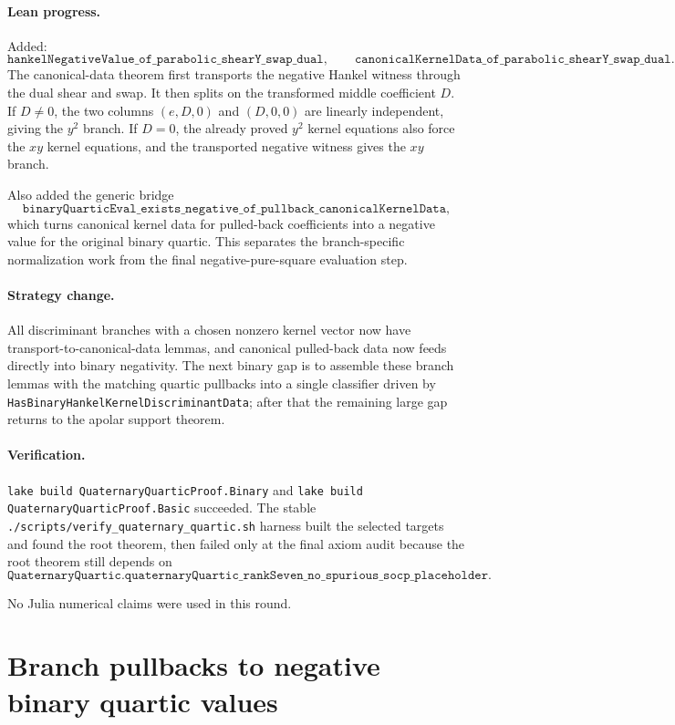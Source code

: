 \documentclass[11pt]{article}
\begin{document}
\paragraph{Lean progress.}
Added:
\[
\texttt{hankelNegativeValue\_of\_parabolic\_shearY\_swap\_dual},
\qquad
\texttt{canonicalKernelData\_of\_parabolic\_shearY\_swap\_dual}.
\]
The canonical-data theorem first transports the negative Hankel witness through
the dual shear and swap.  It then splits on the transformed middle coefficient
\(D\).  If \(D\ne0\), the two columns \((e,D,0)\) and \((D,0,0)\) are linearly
independent, giving the \(y^2\) branch.  If \(D=0\), the already proved
\(y^2\) kernel equations also force the \(xy\) kernel equations, and the
transported negative witness gives the \(xy\) branch.

Also added the generic bridge
\[
\texttt{binaryQuarticEval\_exists\_negative\_of\_pullback\_canonicalKernelData},
\]
which turns canonical kernel data for pulled-back coefficients into a negative
value for the original binary quartic.  This separates the branch-specific
normalization work from the final negative-pure-square evaluation step.

\paragraph{Strategy change.}
All discriminant branches with a chosen nonzero kernel vector now have
transport-to-canonical-data lemmas, and canonical pulled-back data now feeds
directly into binary negativity.  The next binary gap is to assemble these
branch lemmas with the matching quartic pullbacks into a single classifier
driven by \texttt{HasBinaryHankelKernelDiscriminantData}; after that the
remaining large gap returns to the apolar support theorem.

\paragraph{Verification.}
\texttt{lake build QuaternaryQuarticProof.Binary} and
\texttt{lake build QuaternaryQuarticProof.Basic} succeeded.  The stable
\texttt{./scripts/verify\_quaternary\_quartic.sh} harness built the selected
targets and found the root theorem, then failed only at the final axiom audit
because the root theorem still depends on
\[
\texttt{QuaternaryQuartic.quaternaryQuartic\_rankSeven\_no\_spurious\_socp\_placeholder}.
\]

No Julia numerical claims were used in this round.

\section*{Branch pullbacks to negative binary quartic values}
\end{document}

